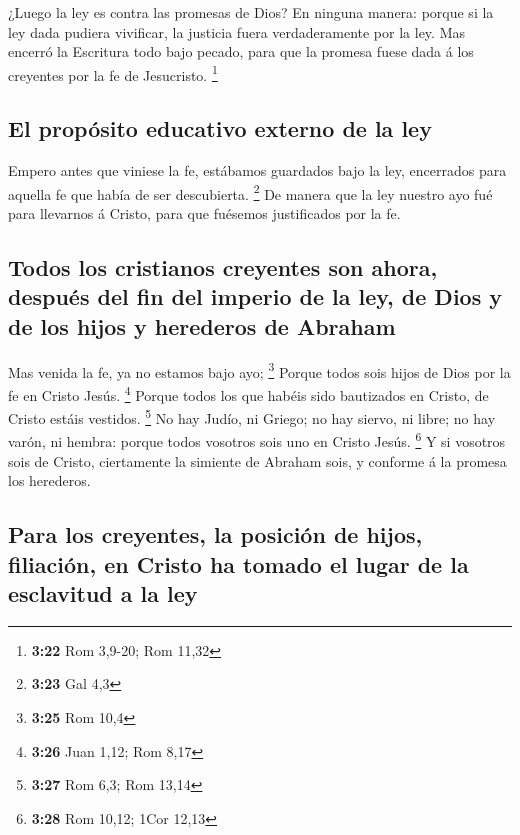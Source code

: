  ¿Luego la ley es contra las promesas de Dios? En ninguna
manera: porque si la ley dada pudiera vivificar, la justicia fuera
verdaderamente por la ley.  Mas encerró la Escritura todo
bajo pecado, para que la promesa fuese dada á los creyentes por la fe de
Jesucristo. \footnote{\textbf{3:22} Rom 3,9-20; Rom 11,32}

\hypertarget{el-propuxf3sito-educativo-externo-de-la-ley}{%
\subsection{El propósito educativo externo de la
ley}\label{el-propuxf3sito-educativo-externo-de-la-ley}}

 Empero antes que viniese la fe, estábamos guardados bajo
la ley, encerrados para aquella fe que había de ser descubierta.
\footnote{\textbf{3:23} Gal 4,3}  De manera que la ley
nuestro ayo fué para llevarnos á Cristo, para que fuésemos justificados
por la fe.

\hypertarget{todos-los-cristianos-creyentes-son-ahora-despuuxe9s-del-fin-del-imperio-de-la-ley-de-dios-y-de-los-hijos-y-herederos-de-abraham}{%
\subsection{Todos los cristianos creyentes son ahora, después del fin
del imperio de la ley, de Dios y de los hijos y herederos de
Abraham}\label{todos-los-cristianos-creyentes-son-ahora-despuuxe9s-del-fin-del-imperio-de-la-ley-de-dios-y-de-los-hijos-y-herederos-de-abraham}}

 Mas venida la fe, ya no estamos bajo ayo; \footnote{\textbf{3:25}
  Rom 10,4}  Porque todos sois hijos de Dios por la fe en
Cristo Jesús. \footnote{\textbf{3:26} Juan 1,12; Rom 8,17} 
Porque todos los que habéis sido bautizados en Cristo, de Cristo estáis
vestidos. \footnote{\textbf{3:27} Rom 6,3; Rom 13,14}  No
hay Judío, ni Griego; no hay siervo, ni libre; no hay varón, ni hembra:
porque todos vosotros sois uno en Cristo Jesús. \footnote{\textbf{3:28}
  Rom 10,12; 1Cor 12,13}  Y si vosotros sois de Cristo,
ciertamente la simiente de Abraham sois, y conforme á la promesa los
herederos.

\hypertarget{para-los-creyentes-la-posiciuxf3n-de-hijos-filiaciuxf3n-en-cristo-ha-tomado-el-lugar-de-la-esclavitud-a-la-ley}{%
\subsection{Para los creyentes, la posición de hijos, filiación, en
Cristo ha tomado el lugar de la esclavitud a la
ley}\label{para-los-creyentes-la-posiciuxf3n-de-hijos-filiaciuxf3n-en-cristo-ha-tomado-el-lugar-de-la-esclavitud-a-la-ley}}

